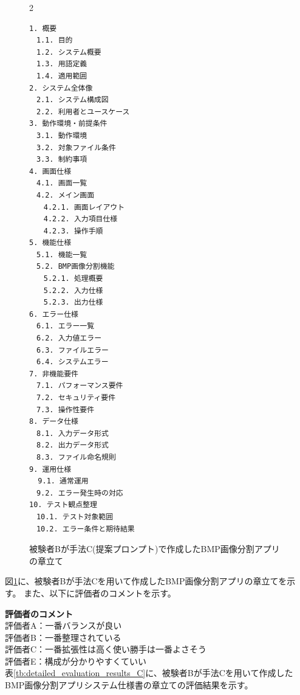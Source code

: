 \begin{figure}[tp]
\begin{tcolorbox}[
  colback=white,
  colframe=orange,
  fonttitle=\bfseries
]
\begin{multicols}{2}
\footnotesize
\ttfamily
\fontsize{8}{9}\selectfont
\begin{verbatim}
1. 概要
　1.1. 目的
　1.2. システム概要
　1.3. 用語定義
　1.4. 適用範囲
2. システム全体像
　2.1. システム構成図
　2.2. 利用者とユースケース
3. 動作環境・前提条件
　3.1. 動作環境
　3.2. 対象ファイル条件
　3.3. 制約事項
4. 画面仕様
　4.1. 画面一覧
　4.2. メイン画面
　　4.2.1. 画面レイアウト
　　4.2.2. 入力項目仕様
　　4.2.3. 操作手順
5. 機能仕様
　5.1. 機能一覧
　5.2. BMP画像分割機能
　　5.2.1. 処理概要
　　5.2.2. 入力仕様
　　5.2.3. 出力仕様
6. エラー仕様
　6.1. エラー一覧
　6.2. 入力値エラー
　6.3. ファイルエラー
　6.4. システムエラー
7. 非機能要件
　7.1. パフォーマンス要件
　7.2. セキュリティ要件
　7.3. 操作性要件
8. データ仕様
　8.1. 入力データ形式
　8.2. 出力データ形式
　8.3. ファイル命名規則
9. 運用仕様
  9.1. 通常運用
　9.2. エラー発生時の対応
10. テスト観点整理
　10.1. テスト対象範囲
　10.2. エラー条件と期待結果
\end{verbatim}
\end{multicols}
\end{tcolorbox}
\caption{被験者Bが手法C(提案プロンプト)で作成したBMP画像分割アプリの章立て}
\label{fig:C_chapter_structure_of_bmp_app_1}
\end{figure}

図\ref{fig:C_chapter_structure_of_bmp_app_1}に、被験者Bが手法Cを用いて作成したBMP画像分割アプリの章立てを示す。
また、以下に評価者のコメントを示す。

\noindent\textbf{評価者のコメント}\\
評価者A：一番バランスが良い\\
評価者B：一番整理されている\\
評価者C：一番拡張性は高く使い勝手は一番よさそう\\
評価者E：構成が分かりやすくていい\\

表\ref{tb:detailed_evaluation_results_C}に、被験者Bが手法Cを用いて作成したBMP画像分割アプリシステム仕様書の章立ての評価結果を示す。

